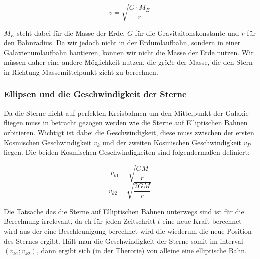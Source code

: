 \documentclass[a4paper, 10pt]{article}
\begin{document}
\begin{multicols*}{2}
\begin{equation}
v = \sqrt{\frac{G \cdot M_E}{r}}
\end{equation}

\( M_E \) steht dabei für die Masse der Erde, \( G \) für die
Gravitaitonskonstante und \( r \) für den Bahnradius.  Da wir jedoch nicht in
der Erdumlaufbahn, sondern in einer Galaxienumlaufbahn hantieren, können wir
nicht die Masse der Erde nutzen. Wir müssen daher eine andere Möglichkeit
nutzen, die größe der Masse, die den Stern in Richtung Massemittelpunkt zieht zu
berechnen.

\subsubsection{Ellipsen und die Geschwindigkeit der Sterne}
Da die Sterne nicht auf perfekten Kreisbahnen um den Mittelpunkt der Galaxie
fliegen muss in betracht gezogen werden wie die Sterne auf Elliptischen Bahnen
orbitieren.  Wichtigt ist dabei die Geschwindigkeit, diese muss zwischen der
ersten Kosmischen Geschwindigkeit \( v_k \) und der zweiten Kosmischen
Geschwindigkeit \( v_P \) liegen. Die beiden Kosmischen Geschwindigkeiten sind
folgendermaßen definiert:

\begin{equation}
v_{k1} = \sqrt{\frac{GM}{r}}
\end{equation}
\begin{equation}
v_{k2} = \sqrt{\frac{2GM}{r}}
\end{equation}

Die Tatsache das die Sterne auf Elliptischen Bahnen unterwegs sind ist für die
Berechnung irrelevant, da eh für jeden Zeitschritt \( t \) eine neue Kraft
berechnet wird aus der eine Beschleunigung berechnet wird die wiederum die neue
Position des Sternes ergibt.  Hält man die Geschwindigkeit der Sterne somit im
interval \( (v_{k1} ; v_{k2}) \), dann ergibt sich (in der Therorie) von
alleine eine elliptische Bahn.


\end{multicols*}
\end{document}
